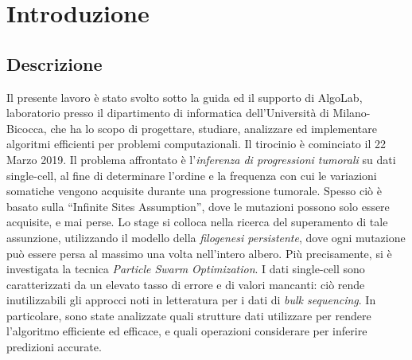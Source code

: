 \chapter{Introduzione}
\section{Descrizione}
Il presente lavoro è stato svolto sotto la guida ed il supporto di AlgoLab, laboratorio presso il dipartimento di informatica dell'Università di Milano-Bicocca, che ha lo scopo di progettare, studiare, analizzare ed implementare algoritmi efficienti per problemi computazionali. Il tirocinio è cominciato il 22 Marzo 2019.
Il problema affrontato è l'\textit{inferenza di progressioni tumorali} su dati single-cell, al fine di determinare l'ordine e la frequenza con cui le variazioni somatiche vengono acquisite durante una progressione tumorale. Spesso ciò è basato sulla “Infinite Sites Assumption”, dove le mutazioni possono solo essere acquisite, e mai perse. Lo stage si colloca nella ricerca del superamento di tale assunzione, utilizzando il modello della \textit{filogenesi persistente}, dove ogni mutazione può essere persa al massimo una volta nell'intero albero. Più precisamente, si è investigata la tecnica \textit{Particle Swarm Optimization}. I dati single-cell sono caratterizzati da un elevato tasso di errore e di valori mancanti: ciò rende inutilizzabili gli approcci noti in letteratura per i dati di \textit{bulk sequencing}. In particolare, sono state analizzate quali strutture dati utilizzare per rendere l'algoritmo efficiente ed efficace, e quali operazioni considerare per inferire predizioni accurate.